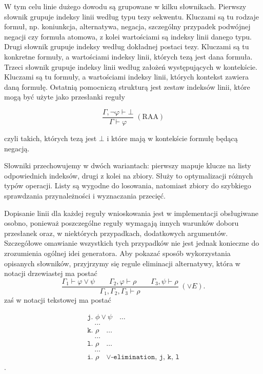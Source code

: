 \documentclass[shortabstract]{iithesis}
\theoremstyle{definition}
\theoremstyle{remark}
\theoremstyle{plain}
\begin{document}
W tym celu linie dużego dowodu są grupowane w kilku słownikach. Pierwszy
słownik grupuje indeksy linii według typu tezy sekwentu. Kluczami są tu rodzaje formuł, np.
koniunkcja, alternatywa, negacja, szczególny przypadek podwójnej negacji czy formuła atomowa,
z kolei wartościami są indeksy linii danego typu.
Drugi słownik grupuje indeksy według dokładnej postaci tezy. Kluczami są tu konkretne formuły,
a wartościami indeksy linii, których tezą jest dana formuła. Trzeci słownik grupuje indeksy linii według
założeń występujących w kontekście. Kluczami są tu formuły, a wartościami indeksy linii, których kontekst zawiera daną formułę.
Ostatnią pomocniczą strukturą jest zestaw indeksów linii, które mogą być użyte jako przesłanki reguły

$$
\frac{\Gamma,\neg\varphi \vdash \bot}{\Gamma \vdash \varphi}\;(\mathrm{RAA})
$$

czyli takich, których tezą jest \(\bot\) i które mają w kontekście formułę będącą negacją.

Słowniki przechowujemy w dwóch wariantach: pierwszy mapuje klucze na listy odpowiednich
indeksów, drugi z kolei na zbiory. Służy to optymalizacji różnych typów operacji.
Listy są wygodne do losowania, natomiast zbiory do szybkiego sprawdzania przynależności i wyznaczania przecięć.

Dopisanie linii dla każdej reguły wnioskowania jest w implementacji obsługiwane
osobno, ponieważ poszczególne reguły wymagają innych warunków doboru przesłanek
oraz, w niektórych przypadkach, dodatkowych argumentów. Szczegółowe omawianie
wszystkich tych przypadków nie jest jednak konieczne do zrozumienia ogólnej idei
generatora. Aby pokazać sposób wykorzystania opisanych słowników, przyjrzymy się
regule eliminacji alternatywy, która w notacji drzewiastej ma postać
\[
\frac{
    \Gamma_1 \vdash \varphi \vee \psi
    \qquad
    \Gamma_2,\varphi \vdash \rho
    \qquad
    \Gamma_3,\psi \vdash \rho
}{
    \Gamma_1,\Gamma_2,\Gamma_3 \vdash \rho
}\;(\vee E).
\]
zaś w notacji tekstowej ma postać

\[
\begin{array}{l}
\texttt{j. } \phi \lor \psi \quad \dots \\
\quad \dots \\
\texttt{k. } \rho \quad \dots \\
\quad \dots \\
\texttt{l. } \rho \quad \dots \\
\quad \dots \\
\texttt{i. } \rho \quad \texttt{\(\lor\)-elimination, j, k, l}
\end{array}
\].
\end{document}
